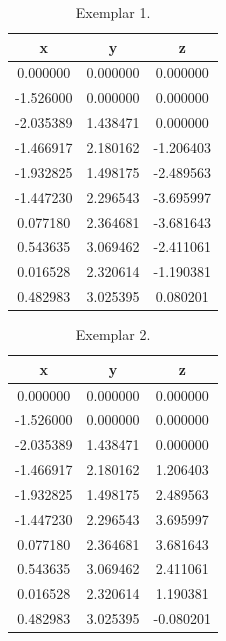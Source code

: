 \documentclass[a4paper,12pt]{article}
\begin{document}
	\begin{center}
		\begin{minipage}{0.45 \linewidth}
			\begin{table}[H]
				\centering
				\begin{tabular}{ |c c c| } 
					\hline
					\textbf{x} & \textbf{y} & \textbf{z} \\\hline
					0.000000 & 0.000000 & 0.000000\\
					-1.526000 & 0.000000 & 0.000000\\
					-2.035389 & 1.438471 & 0.000000\\
					-1.466917 & 2.180162 & -1.206403\\
					-1.932825 & 1.498175 & -2.489563\\
					-1.447230 & 2.296543 & -3.695997\\
					0.077180 & 2.364681 & -3.681643\\
					0.543635 & 3.069462 & -2.411061\\
					0.016528 & 2.320614 & -1.190381\\
					0.482983 & 3.025395 & 0.080201\\\hline
				\end{tabular}
				\caption{Exemplar 1.}
				\label{tab:re1}
			\end{table}
		\end{minipage}
		\begin{minipage}{0.45 \linewidth}
			\begin{table}[H]
				\centering
				\begin{tabular}{ |c c c| } 
					\hline
					\textbf{x} & \textbf{y} & \textbf{z} \\\hline
					0.000000 & 0.000000 & 0.000000\\
					-1.526000 & 0.000000 & 0.000000\\
					-2.035389 & 1.438471 & 0.000000\\
					-1.466917 & 2.180162 & 1.206403\\
					-1.932825 & 1.498175 & 2.489563\\
					-1.447230 & 2.296543 & 3.695997\\
					0.077180 & 2.364681 & 3.681643\\
					0.543635 & 3.069462 & 2.411061\\
					0.016528 & 2.320614 & 1.190381\\
					0.482983 & 3.025395 & -0.080201\\\hline
				\end{tabular}
				\caption{Exemplar 2.}
				\label{tab:re2}
			\end{table}
		\end{minipage}
	\end{center}
\end{document}
